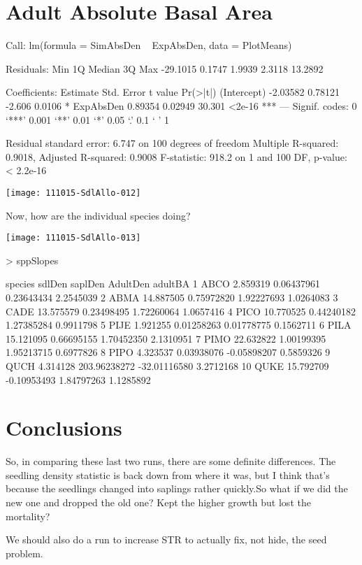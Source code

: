 \documentclass{article}
\begin{document}
\section{Adult Absolute Basal Area}
\begin{Schunk}
\begin{Soutput}
Call:
lm(formula = SimAbsDen ~ ExpAbsDen, data = PlotMeans)

Residuals:
     Min       1Q   Median       3Q      Max 
-29.1015   0.1747   1.9939   2.3118  13.2892 

Coefficients:
            Estimate Std. Error t value Pr(>|t|)    
(Intercept) -2.03582    0.78121  -2.606   0.0106 *  
ExpAbsDen    0.89354    0.02949  30.301   <2e-16 ***
---
Signif. codes:  0 ‘***’ 0.001 ‘**’ 0.01 ‘*’ 0.05 ‘.’ 0.1 ‘ ’ 1

Residual standard error: 6.747 on 100 degrees of freedom
Multiple R-squared:  0.9018,	Adjusted R-squared:  0.9008 
F-statistic: 918.2 on 1 and 100 DF,  p-value: < 2.2e-16
\end{Soutput}
\end{Schunk}
\texttt{[image: 111015-SdlAllo-012]}

Now, how are the individual species doing?

\texttt{[image: 111015-SdlAllo-013]}
\begin{Schunk}
\begin{Sinput}
>   sppSlopes
\end{Sinput}
\begin{Soutput}
   species    sdlDen      saplDen     AdultDen   adultBA
1     ABCO  2.859319   0.06437961   0.23643434 2.2545039
2     ABMA 14.887505   0.75972820   1.92227693 1.0264083
3     CADE 13.575579   0.23498495   1.72260064 1.0657416
4     PICO 10.770525   0.44240182   1.27385284 0.9911798
5     PIJE  1.921255   0.01258263   0.01778775 0.1562711
6     PILA 15.121095   0.66695155   1.70452350 2.1310951
7     PIMO 22.632822   1.00199395   1.95213715 0.6977826
8     PIPO  4.323537   0.03938076  -0.05898207 0.5859326
9     QUCH  4.314128 203.96238272 -32.01116580 3.2712168
10    QUKE 15.792709  -0.10953493   1.84797263 1.1285892
\end{Soutput}
\end{Schunk}


\section{Conclusions}

So, in comparing these last two runs, there are some definite differences. The seedling density statistic is back down from where it was, but I think that's because the seedlings changed into saplings rather quickly.So what if we did the new one and dropped the old one? Kept the higher growth but lost the mortality?

We should also do a run to increase STR to actually fix, not hide, the seed problem. 
\end{document}
